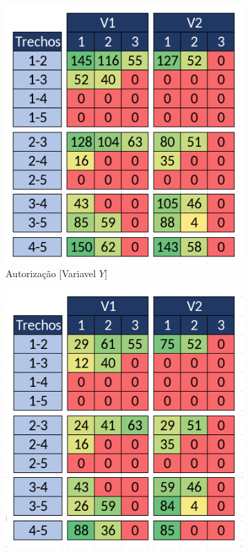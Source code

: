 \begin{figure}[h!]
	\centering
	\begin{subfigure}[b]{0.35\linewidth}
		\includegraphics[width=\linewidth]{img/exemplo1.png}
		\caption{Autorização [Variavel $Y$]}
		\label{fig:auto_assig_a}
	\end{subfigure}\hspace{5mm}
	\begin{subfigure}[b]{0.35\linewidth}
		\includegraphics[width=\linewidth]{img/exemplo2.png}

\end{subfigure}
\end{figure}
